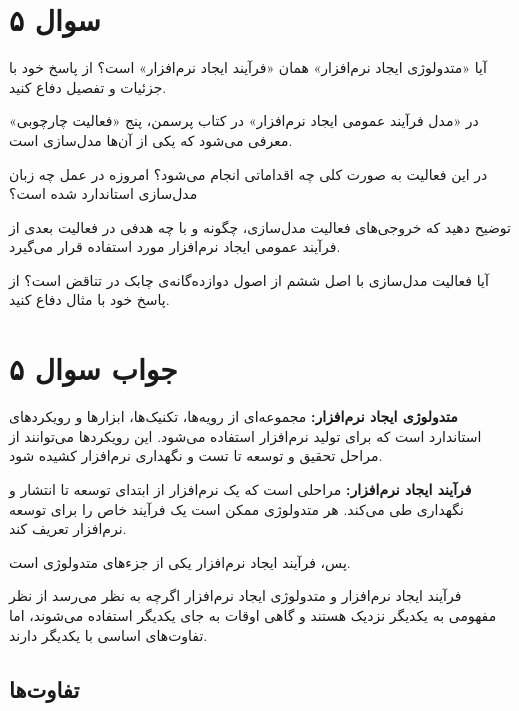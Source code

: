 \section*{سوال ۵}

	آیا «متدولوژی ایجاد نرم‌افزار» همان «فرآیند ایجاد نرم‌افزار» است؟ از پاسخ خود با جزئیات و تفصیل دفاع کنید.
	
	در «مدل فرآیند عمومی ایجاد نرم‌افزار» در کتاب پرسمن، پنج «فعالیت چارچوبی» معرفی می‌شود که یکی از آن‌ها مدل‌سازی است.
	
	در این فعالیت به صورت کلی چه اقداماتی انجام می‌شود؟ امروزه در عمل چه زبان مدل‌سازی استاندارد شده است؟
	
	توضیح دهید که خروجی‌های فعالیت مدل‌سازی، چگونه و با چه هدفی در فعالیت بعدی از فرآیند عمومی ایجاد نرم‌افزار مورد استفاده قرار می‌گیرد.
	
	آیا فعالیت مدل‌سازی با اصل ششم از اصول دوازده‌گانه‌ی چابک در تناقض است؟ از پاسخ خود با مثال دفاع کنید.


\section*{جواب سوال ۵}

\textbf{متدولوژی ایجاد نرم‌افزار:} مجموعه‌ای از رویه‌ها، تکنیک‌ها، ابزارها و رویکردهای استاندارد است که برای تولید نرم‌افزار استفاده می‌شود. این رویکردها می‌توانند از مراحل تحقیق و توسعه تا تست و نگهداری نرم‌افزار کشیده شود.

\textbf{فرآیند ایجاد نرم‌افزار:} مراحلی است که یک نرم‌افزار از ابتدای توسعه تا انتشار و نگهداری طی می‌کند. هر متدولوژی ممکن است یک فرآیند خاص را برای توسعه نرم‌افزار تعریف کند.

پس، فرآیند ایجاد نرم‌افزار یکی از جزء‌های متدولوژی است.

فرآیند ایجاد نرم‌افزار و متدولوژی ایجاد نرم‌افزار اگرچه به نظر می‌رسد از نظر مفهومی به یکدیگر نزدیک هستند و گاهی اوقات به جای یکدیگر استفاده می‌شوند، اما تفاوت‌های اساسی با یکدیگر دارند.

\subsection*{تفاوت‌ها}

